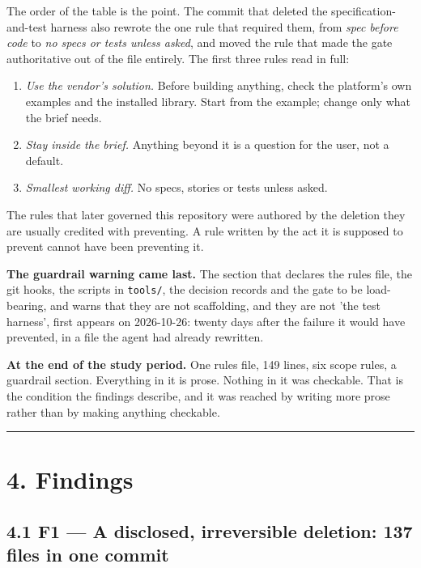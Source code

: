 \documentclass[11pt,a4paper]{article}
\begin{document}
The order of the table is the point. The commit that deleted the specification-and-test harness also rewrote the one rule that required them, from \emph{spec before code} to \emph{no specs or tests unless asked}, and moved the rule that made the gate authoritative out of the file entirely. The first three rules read in full:

\begin{enumerate}
\item \emph{Use the vendor's solution.} Before building anything, check the platform's own examples and the installed library. Start from the example; change only what the brief needs.
\item \emph{Stay inside the brief.} Anything beyond it is a question for the user, not a default.
\item \emph{Smallest working diff.} No specs, stories or tests unless asked.
\end{enumerate}

The rules that later governed this repository were authored by the deletion they are usually credited with preventing. A rule written by the act it is supposed to prevent cannot have been preventing it.

\textbf{The guardrail warning came last.} The section that declares the rules file, the git hooks, the scripts in \texttt{tools/}, the decision records and the gate to be load-bearing, and warns that they are \textquotedbl{}not scaffolding, and they are not 'the test harness'\textquotedbl{}, first appears on 2026-10-26: twenty days after the failure it would have prevented, in a file the agent had already rewritten.

\textbf{At the end of the study period.} One rules file, 149 lines, six scope rules, a guardrail section. Everything in it is prose. Nothing in it was checkable. That is the condition the findings describe, and it was reached by writing more prose rather than by making anything checkable.

\medskip\hrule\medskip

\section*{4. Findings}

\subsection*{4.1 F1 --- A disclosed, irreversible deletion: 137 files in one commit}
\end{document}
